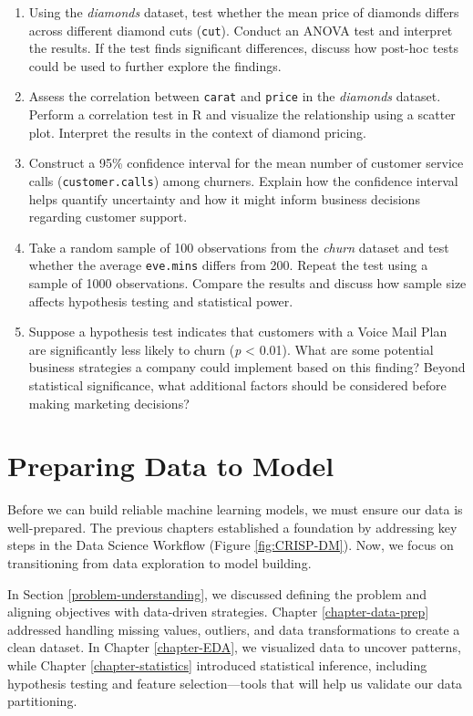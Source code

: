\documentclass[
  11pt,
]{book}
\theoremstyle{definition}
\theoremstyle{definition}
\theoremstyle{definition}
\theoremstyle{definition}
\theoremstyle{remark}
\begin{document}
\begin{enumerate}
\item
  Using the \emph{diamonds} dataset, test whether the mean price of diamonds differs across different diamond cuts (\texttt{cut}). Conduct an ANOVA test and interpret the results. If the test finds significant differences, discuss how post-hoc tests could be used to further explore the findings.
\item
  Assess the correlation between \texttt{carat} and \texttt{price} in the \emph{diamonds} dataset. Perform a correlation test in R and visualize the relationship using a scatter plot. Interpret the results in the context of diamond pricing.
\item
  Construct a 95\% confidence interval for the mean number of customer service calls (\texttt{customer.calls}) among churners. Explain how the confidence interval helps quantify uncertainty and how it might inform business decisions regarding customer support.
\item
  Take a random sample of 100 observations from the \emph{churn} dataset and test whether the average \texttt{eve.mins} differs from 200. Repeat the test using a sample of 1000 observations. Compare the results and discuss how sample size affects hypothesis testing and statistical power.
\item
  Suppose a hypothesis test indicates that customers with a Voice Mail Plan are significantly less likely to churn (\emph{p} \textless{} 0.01). What are some potential business strategies a company could implement based on this finding? Beyond statistical significance, what additional factors should be considered before making marketing decisions?
\end{enumerate}

\chapter{Preparing Data to Model}\label{chapter-modeling}

Before we can build reliable machine learning models, we must ensure our data is well-prepared. The previous chapters established a foundation by addressing key steps in the Data Science Workflow (Figure \ref{fig:CRISP-DM}). Now, we focus on transitioning from data exploration to model building.

In Section \ref{problem-understanding}, we discussed defining the problem and aligning objectives with data-driven strategies. Chapter \ref{chapter-data-prep} addressed handling missing values, outliers, and data transformations to create a clean dataset. In Chapter \ref{chapter-EDA}, we visualized data to uncover patterns, while Chapter \ref{chapter-statistics} introduced statistical inference, including hypothesis testing and feature selection---tools that will help us validate our data partitioning.
\end{document}
